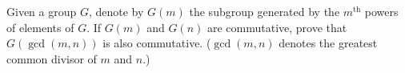 Given a group \(G\), denote by \(G(m)\) the subgroup generated by the \(m^{\text{th}}\) powers of elements of \(G\). If \(G(m)\) and \(G(n)\) are commutative, prove that \(G(\operatorname{gcd}(m,n))\) is also commutative. (\(\operatorname{gcd}(m,n)\) denotes the greatest common divisor of \(m\) and \(n\).)